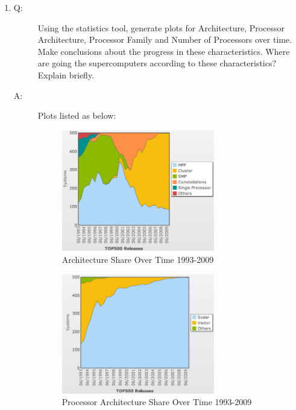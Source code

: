 \documentclass[12pt]{article}
\begin{document}
\begin{enumerate}
\item
\begin{description}
\item[Q: ]Using the statistics tool, generate plots for Architecture, 
Processor Architecture, Processor Family and Number of Processors over 
time. Make conclusions about the progress in these characteristics. 
Where are going the supercomputers according to these characteristics? 
Explain briefly.
\item[A: ]Plots listed as below:
\begin{figure}[h!]
	\begin{center}
		\includegraphics[width=0.7\textwidth, angle=0]{arch-share.png}
		\caption{\label{fig:arch-share}Architecture Share Over Time 1993-2009}
	\end{center}
\end{figure}
\begin{figure}[h!]
	\begin{center}
		\includegraphics[width=0.7\textwidth, angle=0]{proc-arch-share.png}
		\caption{\label{fig:proc-arch-share}Processor Architecture Share Over Time 1993-2009}
	\end{center}

\end{figure}
\end{description}
\end{enumerate}
\end{document}
